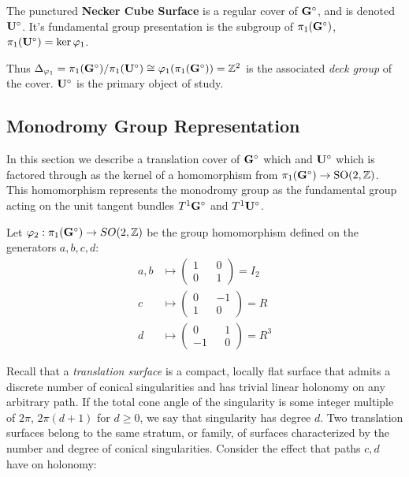\documentclass[]{article}
\def\SO{\mathrm{SO}}
\begin{document}
\begin{Def}
The punctured \textbf{Necker Cube Surface} is a regular cover of $\mathbf{G}^\circ$, and is denoted $\mathbf{U}^\circ$. It's fundamental group presentation is the subgroup of $\pi_1(\mathbf{G}^\circ)$, $\pi_1(\mathbf{U}^\circ)=\ker\varphi_1$.
\end{Def}

Thus $\Delta_{\varphi_1}=\pi_1(\mathbf{G}^\circ)/\pi_1(\mathbf{U}^\circ)\cong \varphi_1(\pi_1(\mathbf{G}^\circ))=\mathbb{Z}^2$ is the associated \emph{deck group} of the cover. $\mathbf{U}^\circ$ is the primary object of study.

\subsection{Monodromy Group Representation}
In this section we describe a translation cover of $\mathbf{G}^\circ$ which and $\mathbf{U}^\circ$ which is factored through as the kernel of a homomorphism from $\pi_1(\bGs)\rightarrow \SO(2,\ZZ)$. This homomorphism represents the monodromy group as the fundamental group acting on the unit tangent bundles $T^1\mathbf{G}^\circ$ and $T^1\mathbf{U}^\circ$. 




\begin{Def}
Let $\varphi_2:\pi_1(\mathbf{G}^\circ)\rightarrow SO(2,\mathbb{Z})$ be the group homomorphism defined on the generators $a,b,c,d$:
\begin{align*}
a,b & \mapsto \begin{pmatrix}
1 && 0 \\ 0 && 1\end{pmatrix}=I_2\\
c & \mapsto\begin{pmatrix}0 && -1\\1 && 0\end{pmatrix}=R\\ d & \mapsto\begin{pmatrix}0 && 1\\-1 && 0\end{pmatrix}=R^3
\end{align*}
\end{Def}

Recall that a \emph{translation surface} is a compact, locally flat surface that admits a discrete number of conical singularities and has trivial linear holonomy on any arbitrary path. If the total cone angle of the singularity is some integer multiple of $2\pi$, $2\pi(d+1)$ for $d\geq 0$, we say that singularity has degree $d$. Two translation surfaces belong to the same stratum, or family, of surfaces characterized by the number and degree of conical singularities. Consider the effect that paths $c,d$ have on holonomy: 
\end{document}
